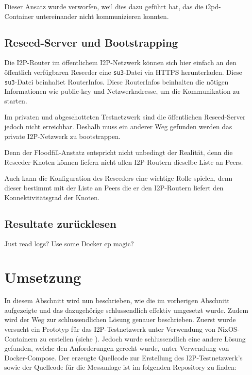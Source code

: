 Dieser Ansatz wurde verworfen, weil dies dazu geführt hat, das die i2pd-Container untereinander nicht kommunizieren konnten.

\subsection{Reseed-Server und Bootstrapping}

Die I2P-Router im öffentlichem I2P-Netzwerk können sich hier einfach an den öffentlich verfügbaren Reseeder eine \lstinline|su3|-Datei via HTTPS herunterladen.
Diese \lstinline|su3|-Datei beinhaltet RouterInfos. 
Diese RouterInfos beinhalten die nötigen Informationen wie public-key und Netzwerkadresse, um die Kommunikation zu starten.

Im privaten und abgeschotteten Testnetzwerk sind die öffentlichen Reseed-Server jedoch nicht erreichbar.
Deshalb muss ein anderer Weg gefunden werden das private I2P-Netzwerk zu bootstrappen.

Denn der Floodfill-Anstatz entspricht nicht unbedingt der Realität, denn die Reseeder-Knoten können liefern nicht allen I2P-Routern dieselbe Liste an Peers.

Auch kann die Konfiguration des Reseeders eine wichtige Rolle spielen, denn dieser bestimmt mit der Liste an Peers die er den I2P-Routern liefert den Konnektivitätsgrad der Knoten.

\subsection{Resultate zurücklesen}

Just read logs? Use some Docker cp magic?

\section{Umsetzung}\label{sec:umsetzung}

In diesem Abschnitt wird nun beschrieben,
wie die im vorherigen Abschnitt aufgezeigte  und das dazugehörige  schlussendlich effektiv umgesetzt wurde.
Zudem wird der Weg zur schlussendlichen Lösung genauer beschrieben.
Zuerst wurde versucht ein Prototyp für das I2P-Testnetzwerk unter Verwendung von NixOS-Containern zu erstellen (siehe ).
Jedoch wurde schlussendlich eine andere Lösung gefunden, welche den Anforderungen gerecht wurde, unter Verwendung von Docker-Compose.
Der erzeugte Quellcode zur Erstellung des I2P-Testnetzwerk's sowie der Quellcode für die Messanlage ist im folgenden Repository zu finden:

